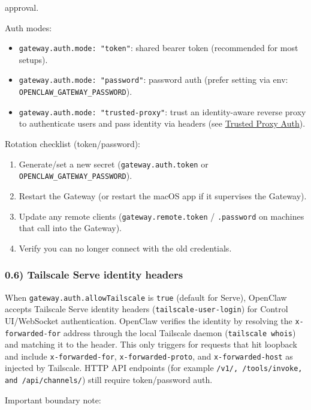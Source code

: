 approval.

Auth modes:

\begin{itemize}
  \item \texttt{gateway.auth.mode: "token"}: shared bearer token (recommended for most setups).
  \item \texttt{gateway.auth.mode: "password"}: password auth (prefer setting via env: \texttt{OPENCLAW\_GATEWAY\_PASSWORD}).
  \item \texttt{gateway.auth.mode: "trusted-proxy"}: trust an identity-aware reverse proxy to authenticate users and pass identity via headers (see \href{/gateway/trusted-proxy-auth}{Trusted Proxy Auth}).
\end{itemize}


Rotation checklist (token/password):

\begin{enumerate}
  \item Generate/set a new secret (\texttt{gateway.auth.token} or \texttt{OPENCLAW\_GATEWAY\_PASSWORD}).
  \item Restart the Gateway (or restart the macOS app if it supervises the Gateway).
  \item Update any remote clients (\texttt{gateway.remote.token} / \texttt{.password} on machines that call into the Gateway).
  \item Verify you can no longer connect with the old credentials.
\end{enumerate}


\subsubsection{0.6) Tailscale Serve identity headers}


When \texttt{gateway.auth.allowTailscale} is \texttt{true} (default for Serve), OpenClaw
accepts Tailscale Serve identity headers (\texttt{tailscale-user-login}) for Control
UI/WebSocket authentication. OpenClaw verifies the identity by resolving the
\texttt{x-forwarded-for} address through the local Tailscale daemon (\texttt{tailscale whois})
and matching it to the header. This only triggers for requests that hit loopback
and include \texttt{x-forwarded-for}, \texttt{x-forwarded-proto}, and \texttt{x-forwarded-host} as
injected by Tailscale.
HTTP API endpoints (for example \texttt{/v1/\textit{}, \texttt{/tools/invoke}, and \texttt{/api/channels/}})
still require token/password auth.

Important boundary note:

